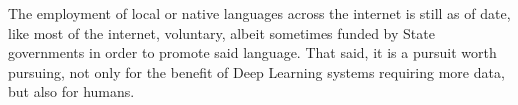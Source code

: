 \documentclass[11pt]{article}
\begin{document}
The employment of local or native languages across the internet is still as of
date, like most of the internet, voluntary, albeit sometimes funded by State
governments in order to promote said language. That said, it is a pursuit worth
pursuing, not only for the benefit of Deep Learning systems requiring more data,
but also for humans.

% 
% 












\end{document}
